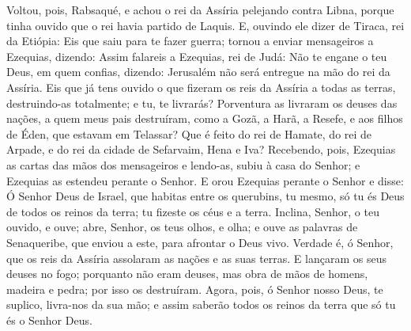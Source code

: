 Voltou, pois, Rabsaqué, e achou o rei da Assíria pelejando contra
Libna, porque tinha ouvido que o rei havia partido de Laquis. E,
ouvindo ele dizer de Tiraca, rei da Etiópia: Eis que saiu para te
fazer guerra; tornou a enviar mensageiros a Ezequias, dizendo:
Assim falareis a Ezequias, rei de Judá: Não te engane o teu
Deus, em quem confias, dizendo: Jerusalém não será entregue na mão
do rei da Assíria. Eis que já tens ouvido o que fizeram os
reis da Assíria a todas as terras, destruindo-as totalmente; e tu,
te livrarás? Porventura as livraram os deuses das nações, a
quem meus pais destruíram, como a Gozã, a Harã, a Resefe, e aos
filhos de Éden, que estavam em Telassar? Que é feito do rei
de Hamate, do rei de Arpade, e do rei da cidade de Sefarvaim, Hena e
Iva? Recebendo, pois, Ezequias as cartas das mãos dos
mensageiros e lendo-as, subiu à casa do Senhor; e Ezequias as
estendeu perante o Senhor. E orou Ezequias perante o Senhor e
disse: Ó Senhor Deus de Israel, que habitas entre os querubins, tu
mesmo, só tu és Deus de todos os reinos da terra; tu fizeste os céus
e a terra. Inclina, Senhor, o teu ouvido, e ouve; abre,
Senhor, os teus olhos, e olha; e ouve as palavras de Senaqueribe,
que enviou a este, para afrontar o Deus vivo. Verdade é, ó
Senhor, que os reis da Assíria assolaram as nações e as suas terras.
E lançaram os seus deuses no fogo; porquanto não eram deuses,
mas obra de mãos de homens, madeira e pedra; por isso os destruíram.
Agora, pois, ó Senhor nosso Deus, te suplico, livra-nos da
sua mão; e assim saberão todos os reinos da terra que só tu és o
Senhor Deus.

